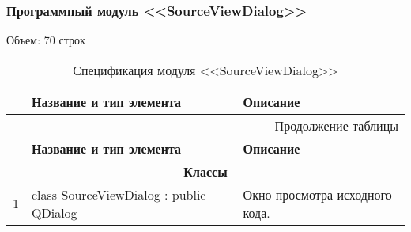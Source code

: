 \subsubsection*{Программный модуль <<SourceViewDialog>>}
Объем: 70 строк

\small
\singlespacing
\begin{longtable}[h]{|p{}|p{}|p{}|}
  \caption{Спецификация модуля <<SourceViewDialog>>}
	\\ \hline
	  \textbf{\No}                  &
	  \textbf{Название и тип элемента}  &
	  \textbf{Описание}
	\\ \hline
  \endfirsthead

  \multicolumn{3}{r}{Продолжение таблицы \thetable{}}
  \\ \hline
	  \textbf{\No}                  &
	  \textbf{Название и тип элемента}  &
	  \textbf{Описание}
	\\ \hline
  \endhead

  \multicolumn{3}{|c|}{\textbf{Классы}} \\
  \hline
  1 & class SourceViewDialog : public QDialog & Окно просмотра исходного кода. \\ \hline
\end{longtable}
\normalsize
\onehalfspacing


